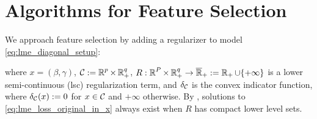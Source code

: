 \section{Algorithms for Feature Selection}
\label{sec:pgd_methods}
We approach feature selection by adding a regularizer to model \eqref{eq:lme_diagonal_setup}: 

where $x = (\beta, \gamma)$, 
$\mathcal{C}:=\operatorname{\mathbb{R}}^p\times \operatorname{\mathbb{R}}^q_+$,
$R:\operatorname{\mathbb{R}}^P\times\operatorname{\mathbb{R}}^q_+\rightarrow {\overline{\operatorname{\mathbb{R}}}}_+:=\operatorname{\mathbb{R}}_+\cup\{+\infty\}$
is a 
lower semi-continuous (lsc) regularization term, and
$\delta_{\mathcal{C}}$ is the convex indicator function, where
$\delta_{\mathcal{C}}(x) :=0$ for $x \in \mathcal{C}$ and $+\infty$ otherwise.
By \cite[Theorem 2]{Theory1}, solutions to \eqref{eq:lme_loss_original_in_x}
always exist when $R$ has compact lower level sets.
